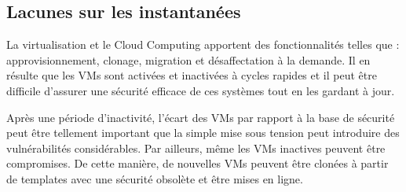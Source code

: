 \subsection*{Lacunes sur les instantanées}

La virtualisation et le Cloud Computing apportent des fonctionnalités telles que : approvisionnement, clonage, migration et désaffectation à la demande. Il en résulte que les VMs sont activées et inactivées à cycles rapides et il peut être difficile d'assurer une sécurité efficace de ces systèmes tout en les gardant à jour.

Après une période d'inactivité, l'écart des VMs par rapport à la base de sécurité peut être tellement important que la simple mise sous tension peut introduire des vulnérabilités considérables. Par ailleurs, même les VMs inactives peuvent être compromises. De cette manière, de nouvelles VMs peuvent être clonées à partir de templates avec une sécurité obsolète et être mises en ligne.

